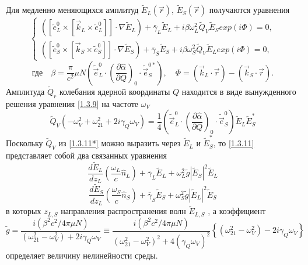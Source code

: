 \documentclass[a4paper]{article}
\begin{document}
Для медленно меняющихся амплитуд $\tilde{E}_{L}(\vec{r})$, $\tilde{E}_{S}(\vec{r})$ получаются уравнения  
\begin{equation}
	\begin{cases}
		\left(\left[\tilde{e}_{L}^{0}\times\left[\vec{k}_{L}\times\tilde{e}_{L}^{0}\right]\right]\cdot\nabla\tilde{E}_{L}\right)+\bar{\gamma}_{L}\tilde{E}_{L}+i\beta\omega_{L}^{2}\tilde{Q}_{V}\tilde{E}_{S}exp(i\Phi)=0,\\
		\left(\left[\tilde{e}_{S}^{0}\times\left[\vec{k}_{S}\times\tilde{e}_{S}^{0}\right]\right]\cdot\nabla\tilde{E}_{S}\right)+\bar{\gamma}_{S}\tilde{E}_{S}+i\beta\omega_{S}^{2}\tilde{Q}_{V}\tilde{E}_{L}exp(i\Phi)=0,
	\end{cases}
\label{1.3.11}
\end{equation}
$$\text{где}\quad\beta=\frac{\pi}{c^{2}}\mu N\left(\tilde{\vec{e}}_{L}^{0}\cdot\left(\frac{\partial\hat{\alpha}}{\partial Q}\right)_{0}\cdot\tilde{\vec{e}}_{S}^{0*}\right),\quad\Phi=\left(\vec{k}_{L}\cdot\vec{r}\right)-\left(\vec{k}_{S}\cdot\vec{r}\right).$$
Амплитуда $\tilde{Q}_{r}$ колебания ядерной координаты $Q$ находится в виде вынужденного решения уравнения \eqref{1.3.9} на частоте  $\omega_{V}$
\begin{equation}
	\tilde{Q}_{V}(-\omega_{V}^{2}+\omega_{21}^{2}+2i\gamma_{Q}\omega_{V})=\frac{1}{4}\left(\tilde{\vec{e}}_{L}^{0}\cdot\left(\frac{\partial\hat{\alpha}}{\partial Q}\right)_{0}\cdot\tilde{\vec{e}}_{S}^{0}\right)\tilde{E}_{L}\tilde{E}_{S}^{*}
	\tag{11*}
	\label{1.3.11*}
\end{equation}
Поскольку $\tilde{Q}_{V}$ из \eqref{1.3.11*} можно выразить через $\tilde{E}_{L}$ и $\tilde{E}^{*}_{S}$, то \eqref{1.3.11} представляет собой два связанных уравнения
\begin{equation}
	\frac{d\tilde{E}_{L}}{dz_{L}}\left(\frac{\omega_{L}}{c}\hat{n}_{L}\right)+\bar{\gamma}_{L}\tilde{E}_{L}+\omega_{L}^{2}\tilde{g}\left|\tilde{E}_{S}\right|^{2}\tilde{E}_{L}
	\label{1.3.12}
\end{equation}
$$\frac{d\tilde{E}_{S}}{dz_{L}}\left(\frac{\omega_{S}}{c}\hat{n}_{S}\right)+\bar{\gamma}_{S}\tilde{E}_{S}+\omega_{S}^{2}\tilde{g}\left|\tilde{E}_{L}\right|^{2}\tilde{E}_{S}$$
в которых $z_{L,S}$ направления распространения волн $\tilde{E}_{L,S}$ , а коэффициент 
\begin{equation}
	\tilde{g}=\frac{i(\beta^{2}c^{2}/4\pi\mu N)}{(\omega_{21}^{2}-\omega_{V}^{2})+2i\gamma_{Q}\omega_{V}}\equiv\frac{i(\beta^{2}c^{2}/4\pi\mu N)}{(\omega_{21}^{2}-\omega_{V}^{2})^{2}+4(\gamma_{Q}\omega_{V})^{2}}\left\{(\omega_{21}^{2}-\omega_{V}^{2})-2i\gamma_{Q}\omega_{V}\right\}
	\label{1.3.13}
\end{equation}
определяет величину нелинейности среды. 
\end{document}
